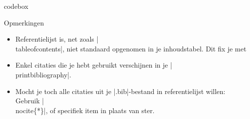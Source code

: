 \begin{saveblock}{codebox}
	\begin{highlightblock}[linewidth=\dimexpr\linewidth - 21.9pt\relax]
	\end{highlightblock}
\end{saveblock}

\begin{frame}{Opmerkingen}%
	\begin{itemize}[label=\textbullet]
		\item Referentielijst is, net zoals \hll|\\tableofcontents|, niet standaard opgenomen in je
		inhoudstabel. Dit fix je met
		
		\item Enkel citaties die je hebt gebruikt verschijnen in je \hll|\\printbibliography|.
		\item Mocht je toch alle citaties uit je \hll|.bib|-bestand in referentielijst willen:\\
		Gebruik \hll|\\nocite\{*\}|, of specifiek item in plaats van ster.
	\end{itemize}
\end{frame}


